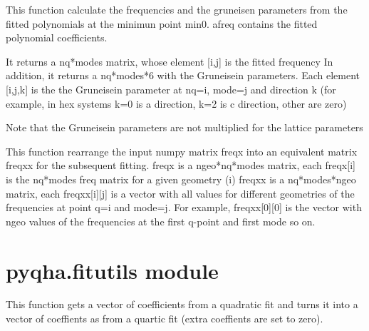 \documentclass[letterpaper,10pt,english]{sphinxmanual}
\begin{document}
\begin{fulllineitems}
\label{pyqha:pyqha.fitfreqgrun.freqmingrun}
This function calculate the frequencies and the gruneisen parameters 
from the fitted polynomials at the minimun point min0. afreq contains the 
fitted polynomial coefficients.

It returns a nq*modes matrix, whose element {[}i,j{]} is the fitted frequency 
In addition, it returns a nq*modes*6 with the Gruneisein parameters.
Each element {[}i,j,k{]} is the the Gruneisein parameter at nq=i, mode=j and direction
k (for example, in hex systems k=0 is a direction, k=2 is c direction, other are zero)

Note that the Gruneisein parameters are not multiplied for the lattice parameters

\end{fulllineitems}


\begin{fulllineitems}
\label{pyqha:pyqha.fitfreqgrun.rearrange_freqx}
This function rearrange the input numpy matrix freqx into an equivalent matrix freqxx
for the subsequent fitting.
freqx is a ngeo*nq*modes matrix, each freqx{[}i{]} is the nq*modes freq matrix for a given geometry (i)
freqxx is a nq*modes*ngeo matrix, each freqxx{[}i{]}{[}j{]} is a vector with all values for different
geometries of the frequencies at point q=i and mode=j. For example, freqxx{[}0{]}{[}0{]}
is the vector with ngeo values of the frequencies at the first q-point and first mode so on.

\end{fulllineitems}



\section{pyqha.fitutils module}
\label{pyqha:pyqha-fitutils-module}\label{pyqha:module-pyqha.fitutils}

\begin{fulllineitems}
\label{pyqha:pyqha.fitutils.expand_quadratic_to_quartic}
This function gets a vector of coefficients from a quadratic fit and turns it
into a vector of coeffients as from a quartic fit (extra coeffients are set to zero).

\end{fulllineitems}
\end{document}
